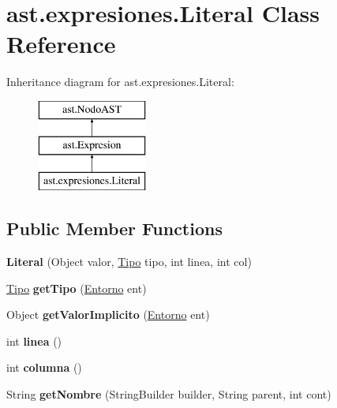 \hypertarget{classast_1_1expresiones_1_1_literal}{}\section{ast.\+expresiones.\+Literal Class Reference}
\label{classast_1_1expresiones_1_1_literal}
Inheritance diagram for ast.\+expresiones.\+Literal\+:\begin{figure}[H]
\begin{center}
\leavevmode
\includegraphics[height=3.000000cm]{classast_1_1expresiones_1_1_literal}
\end{center}
\end{figure}
\subsection*{Public Member Functions}
\begin{DoxyCompactItemize}
\item 
\mbox{\label{classast_1_1expresiones_1_1_literal_a2fcbb0b170459a390c51e05897baf23b}} 
{\bfseries Literal} (Object valor, \mbox{\hyperlink{classentorno_1_1_tipo}{Tipo}} tipo, int linea, int col)
\item 
\mbox{\label{classast_1_1expresiones_1_1_literal_aeffa28d139800b7d2b2394c0574b6e7f}} 
\mbox{\hyperlink{classentorno_1_1_tipo}{Tipo}} {\bfseries get\+Tipo} (\mbox{\hyperlink{classentorno_1_1_entorno}{Entorno}} ent)
\item 
\mbox{\label{classast_1_1expresiones_1_1_literal_ac8f5dd86017ba8f623d2b87a1259c53a}} 
Object {\bfseries get\+Valor\+Implicito} (\mbox{\hyperlink{classentorno_1_1_entorno}{Entorno}} ent)
\item 
\mbox{\label{classast_1_1expresiones_1_1_literal_abeccef2c29fe321ebbf4612a985ffaaa}} 
int {\bfseries linea} ()
\item 
\mbox{\label{classast_1_1expresiones_1_1_literal_ab8acaa47d4363d6409252fdf4e2b82b2}} 
int {\bfseries columna} ()
\item 
\mbox{\label{classast_1_1expresiones_1_1_literal_a31fa9639be621619514a8cce14347c72}} 
String {\bfseries get\+Nombre} (String\+Builder builder, String parent, int cont)
\end{DoxyCompactItemize}


